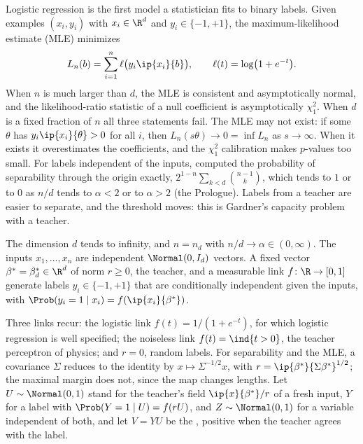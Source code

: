 \begin{refsection}
Logistic regression is the first model a statistician fits to binary labels. Given examples $(x_i,y_i)$ with $x_i\in\R^d$ and $y_i\in\{-1,+1\}$, the maximum-likelihood estimate (MLE) minimizes
\[
L_n(b)=\sum_{i=1}^n\ell\bigl(y_i\ip{x_i}{b}\bigr),\qquad\ell(t)=\log\bigl(1+e^{-t}\bigr).
\]
When $n$ is much larger than $d$, the MLE is consistent and asymptotically normal, and the likelihood-ratio statistic of a null coefficient is asymptotically $\chi^2_1$. When $d$ is a fixed fraction of $n$ all three statements fail. The MLE may not exist: if some $\theta$ has $y_i\ip{x_i}{\theta}>0$ for all $i$, then $L_n(s\theta)\to0=\inf L_n$ as $s\to\infty$. When it exists it overestimates the coefficients, and the $\chi^2_1$ calibration makes $p$-values too small. For labels independent of the inputs, \textcite{Cover1965} computed the probability of separability through the origin exactly, $2^{1-n}\sum_{k<d}\binom{n-1}{k}$, which tends to $1$ or to $0$ as $n/d$ tends to $\alpha<2$ or to $\alpha>2$ (the Prologue). Labels from a teacher are easier to separate, and the threshold moves: this is Gardner's capacity problem with a teacher.

\begin{definition}\label{def:classification:model}
The dimension $d$ tends to infinity, and $n=n_d$ with $n/d\to\alpha\in(0,\infty)$. The inputs $x_1,\dots,x_n$ are independent $\Normal(0,I_d)$ vectors. A fixed vector $\beta^*=\beta^*_d\in\R^d$ of norm $r\ge0$, the teacher, and a measurable link $f\colon\R\to[0,1]$ generate labels $y_i\in\{-1,+1\}$ that are conditionally independent given the inputs, with $\Prob(y_i=1\mid x_i)=f(\ip{x_i}{\beta^*})$.
\end{definition}

Three links recur: the logistic link $f(t)=1/(1+e^{-t})$, for which logistic regression is well specified; the noiseless link $f(t)=\ind\{t>0\}$, the teacher perceptron of physics; and $r=0$, random labels. For separability and the MLE, a covariance $\Sigma$ reduces to the identity by $x\mapsto\Sigma^{-1/2}x$, with $r=\ip{\beta^*}{\Sigma\beta^*}^{1/2}$; the maximal margin does not, since the map changes lengths. Let $U\sim\Normal(0,1)$ stand for the teacher's field $\ip{x}{\beta^*}/r$ of a fresh input, $Y$ for a label with $\Prob(Y=1\mid U)=f(rU)$, and $Z\sim\Normal(0,1)$ for a variable independent of both, and let $V=YU$ be the , positive when the teacher agrees with the label.


\end{refsection}

